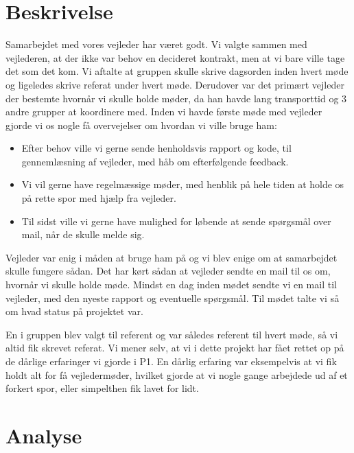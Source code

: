 \section{Beskrivelse}
Samarbejdet med vores vejleder har været godt. Vi valgte sammen med vejlederen, at der ikke var behov en decideret kontrakt, men at vi bare ville tage det som det kom. Vi aftalte at gruppen skulle skrive dagsorden inden hvert møde og ligeledes skrive referat under hvert møde. Derudover var det primært vejleder der bestemte hvornår vi skulle holde møder, da han havde lang transporttid og 3 andre grupper at koordinere med. Inden vi havde første møde med vejleder gjorde vi os nogle få overvejelser om hvordan vi ville bruge ham:
\begin{itemize}
\item	Efter behov ville vi gerne sende henholdsvis rapport og kode, til gennemlæsning af vejleder, med håb om efterfølgende feedback.

\item	Vi vil gerne have regelmæssige møder, med henblik på hele tiden at holde os på rette spor med hjælp fra vejleder.

\item Til sidst ville vi gerne have mulighed for løbende at sende spørgsmål over mail, når de skulle melde sig.
\end{itemize}
Vejleder var enig i måden at bruge ham på og vi blev enige om at samarbejdet skulle fungere sådan. Det har kørt sådan at vejleder sendte en mail til os om, hvornår vi skulle holde møde. Mindst en dag inden mødet sendte vi en mail til vejleder, med den nyeste rapport og eventuelle spørgsmål. Til mødet talte vi så om hvad status på projektet var. 

En i gruppen blev valgt til referent og var således referent til hvert møde, så vi altid fik skrevet referat. Vi mener selv, at vi i dette projekt har fået rettet op på de dårlige erfaringer vi gjorde i P1. En dårlig erfaring var eksempelvis at vi fik holdt alt for få vejledermøder, hvilket gjorde at vi nogle gange arbejdede ud af et forkert spor, eller simpelthen fik lavet for lidt. 

\section{Analyse}

